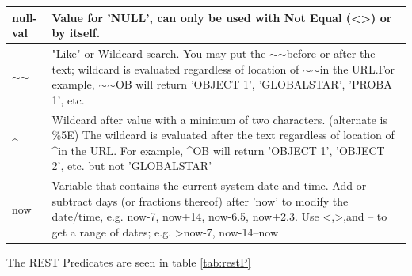 \documentclass[12pt]{article}
\begin{document}
\begin{table}[H]
\begin{tabular}{|l|p{13.5cm}|}
		null-val                  & Value for 'NULL', can only be used with Not Equal (\textless{}\textgreater{}) or by itself.                                                                                                                                                                                         \\ \hline
		$\sim$$\sim$              & "Like" or Wildcard search. You may put the $\sim$$\sim$before or after the text; wildcard is evaluated regardless of location of $\sim$$\sim$in the URL.For example, $\sim$$\sim$OB will return 'OBJECT 1', 'GLOBALSTAR', 'PROBA 1', etc.                                           \\ \hline
		\textasciicircum{}        & Wildcard after value with a minimum of two characters. (alternate is \%5E) The wildcard is evaluated after the text regardless of location of \textasciicircum in the URL. For example, \textasciicircum{}OB will return 'OBJECT 1', 'OBJECT 2', etc. but not 'GLOBALSTAR'           \\ \hline
		now                       & Variable that contains the current system date and time. Add or subtract days (or fractions thereof) after 'now' to modify the date/time, e.g. now-7, now+14, now-6.5, now+2.3. Use \textless{},\textgreater{},and -- to get a range of dates; e.g. \textgreater{}now-7, now-14--now \\ \hline
	\end{tabular}
\end{table}\doublespacing

The REST Predicates are seen in table \ref{tab:restP}
\end{document}
